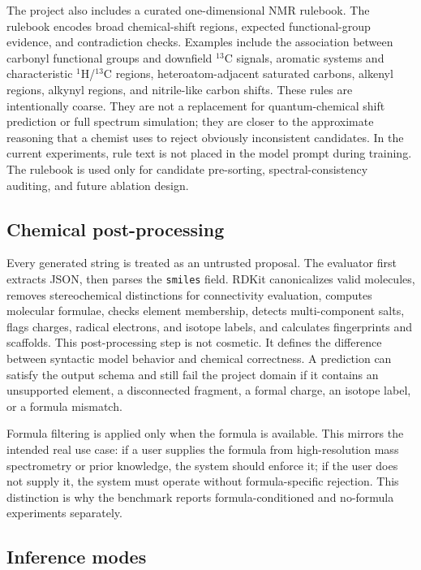 \documentclass{article}
\begin{document}
The project also includes a curated one-dimensional NMR rulebook. The rulebook encodes broad chemical-shift regions, expected functional-group evidence, and contradiction checks. Examples include the association between carbonyl functional groups and downfield \(^{13}\)C signals, aromatic systems and characteristic \(^{1}\)H/\(^{13}\)C regions, heteroatom-adjacent saturated carbons, alkenyl regions, alkynyl regions, and nitrile-like carbon shifts. These rules are intentionally coarse. They are not a replacement for quantum-chemical shift prediction or full spectrum simulation; they are closer to the approximate reasoning that a chemist uses to reject obviously inconsistent candidates. In the current experiments, rule text is not placed in the model prompt during training. The rulebook is used only for candidate pre-sorting, spectral-consistency auditing, and future ablation design.

\subsection{Chemical post-processing}

Every generated string is treated as an untrusted proposal. The evaluator first extracts JSON, then parses the \texttt{smiles} field. RDKit canonicalizes valid molecules, removes stereochemical distinctions for connectivity evaluation, computes molecular formulae, checks element membership, detects multi-component salts, flags charges, radical electrons, and isotope labels, and calculates fingerprints and scaffolds. This post-processing step is not cosmetic. It defines the difference between syntactic model behavior and chemical correctness. A prediction can satisfy the output schema and still fail the project domain if it contains an unsupported element, a disconnected fragment, a formal charge, an isotope label, or a formula mismatch.

Formula filtering is applied only when the formula is available. This mirrors the intended real use case: if a user supplies the formula from high-resolution mass spectrometry or prior knowledge, the system should enforce it; if the user does not supply it, the system must operate without formula-specific rejection. This distinction is why the benchmark reports formula-conditioned and no-formula experiments separately.

\subsection{Inference modes}
\end{document}
